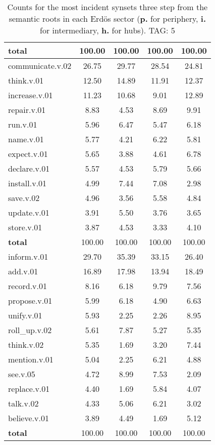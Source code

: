 \begin{table}[h!]
\begin{center}
\begin{tabular}{| l || c | c | c | c |}
{{\bf total}} & 100.00  & 100.00  & 100.00  & 100.00 \\\hline\hline\hline
communicate.v.02 & 26.75  & 29.77  & 28.54  & 24.81 \\\hline
think.v.01 & 12.50  & 14.89  & 11.91  & 12.37 \\\hline
increase.v.01 & 11.23  & 10.68  & 9.01  & 12.89 \\\hline
repair.v.01 & 8.83  & 4.53  & 8.69  & 9.91 \\\hline
run.v.01 & 5.96  & 6.47  & 5.47  & 6.18 \\\hline
name.v.01 & 5.77  & 4.21  & 6.22  & 5.81 \\\hline
expect.v.01 & 5.65  & 3.88  & 4.61  & 6.78 \\\hline
declare.v.01 & 5.57  & 4.53  & 5.79  & 5.66 \\\hline
install.v.01 & 4.99  & 7.44  & 7.08  & 2.98 \\\hline
save.v.02 & 4.96  & 3.56  & 5.58  & 4.84 \\\hline
update.v.01 & 3.91  & 5.50  & 3.76  & 3.65 \\\hline
store.v.01 & 3.87  & 4.53  & 3.33  & 4.10 \\\hline\hline
{{\bf total}} & 100.00  & 100.00  & 100.00  & 100.00 \\\hline\hline\hline
inform.v.01 & 29.70  & 35.39  & 33.15  & 26.40 \\\hline
add.v.01 & 16.89  & 17.98  & 13.94  & 18.49 \\\hline
record.v.01 & 8.16  & 6.18  & 9.79  & 7.56 \\\hline
propose.v.01 & 5.99  & 6.18  & 4.90  & 6.63 \\\hline
unify.v.01 & 5.93  & 2.25  & 2.26  & 8.95 \\\hline
roll\_up.v.02 & 5.61  & 7.87  & 5.27  & 5.35 \\\hline
think.v.02 & 5.35  & 1.69  & 3.20  & 7.44 \\\hline
mention.v.01 & 5.04  & 2.25  & 6.21  & 4.88 \\\hline
see.v.05 & 4.72  & 8.99  & 7.53  & 2.09 \\\hline
replace.v.01 & 4.40  & 1.69  & 5.84  & 4.07 \\\hline
talk.v.02 & 4.33  & 5.06  & 6.21  & 3.02 \\\hline
believe.v.01 & 3.89  & 4.49  & 1.69  & 5.12 \\\hline\hline
{{\bf total}} & 100.00  & 100.00  & 100.00  & 100.00 \\\hline
\end{tabular}
\caption{Counts for the most incident synsets three step from the semantic roots in each Erd\"os sector ({\bf p.} for periphery, {\bf i.} for intermediary, {\bf h.} for hubs). TAG: 5}
\end{center}
\end{table}